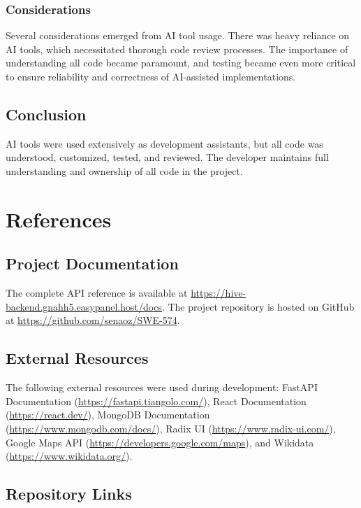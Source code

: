 \documentclass[12pt,a4paper]{report}
\begin{document}
\subsection{Considerations}

Several considerations emerged from AI tool usage. There was heavy reliance on AI tools, which necessitated thorough code review processes. The importance of understanding all code became paramount, and testing became even more critical to ensure reliability and correctness of AI-assisted implementations.

\section{Conclusion}

AI tools were used extensively as development assistants, but all code was understood, customized, tested, and reviewed. The developer maintains full understanding and ownership of all code in the project.


\chapter{References}

\section{Project Documentation}

The complete API reference is available at \url{https://hive-backend.gnahh5.easypanel.host/docs}. The project repository is hosted on GitHub at \url{https://github.com/senaoz/SWE-574}.

\section{External Resources}

The following external resources were used during development: FastAPI Documentation (\url{https://fastapi.tiangolo.com/}), React Documentation (\url{https://react.dev/}), MongoDB Documentation (\url{https://www.mongodb.com/docs/}), Radix UI (\url{https://www.radix-ui.com/}), Google Maps API (\url{https://developers.google.com/maps}), and Wikidata (\url{https://www.wikidata.org/}).

\section{Repository Links}
\end{document}
